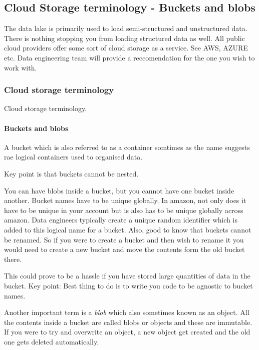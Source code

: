\subsection{Cloud Storage terminology - Buckets and blobs}

The data lake is primarily used to load semi-structured and unstructured data.
There is nothing stopping you from loading structured data as well.
All public cloud providers offer some sort of cloud storage as a service.
See AWS, AZURE etc. Data engineering team will provide a reccomendation for the one you wish to work with.

\subsubsection{Cloud storage terminology}
Cloud storage terminology.

\paragraph{Buckets and blobs}
A bucket which is also referred to as a container somtimes as the name suggests rae logical containers used to organised data.

\begin{note}
    Key point is that buckets cannot be nested.
\end{note}

You can have blobs inside a bucket, but you cannot have one bucket inside another.
Bucket names have to be unique globally.
In amazon, not only does it have to be unique in your account but is also has to be unique globally across amazon.
Data engineers typically create a unique random identifier which is added to this logical name for a bucket.
Also, good to know that buckets cannot be renamed.
So if you were to create a bucket and then wish to rename it you would need to create a new bucket and move the contents form the old bucket there.

\begin{note}
    This could prove to be a hassle if you have stored large quantities of data in the bucket.
    Key point: Best thing to do is to write you code to be agnostic to bucket names.
\end{note}

Another important term is a \textit{blob} which also sometimes known as an object.
All the contents inside a bucket are called blobs or objects and these are immutable.
If you were to try and overwrite an object, a new object get created and the old one gets deleted automatically.

